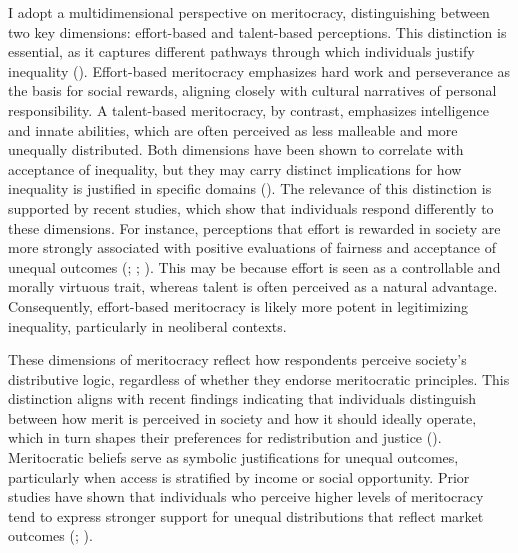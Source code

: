 \documentclass[
  13pt,
]{article}
\begin{document}
I adopt a multidimensional perspective on meritocracy, distinguishing
between two key dimensions: effort-based and talent-based perceptions.
This distinction is essential, as it captures different pathways through
which individuals justify inequality
(). Effort-based meritocracy
emphasizes hard work and perseverance as the basis for social rewards,
aligning closely with cultural narratives of personal responsibility. A
talent-based meritocracy, by contrast, emphasizes intelligence and
innate abilities, which are often perceived as less malleable and more
unequally distributed. Both dimensions have been shown to correlate with
acceptance of inequality, but they may carry distinct implications for
how inequality is justified in specific domains
().
The relevance of this distinction is supported by recent studies, which
show that individuals respond differently to these dimensions. For
instance, perceptions that effort is rewarded in society are more
strongly associated with positive evaluations of fairness and acceptance
of unequal outcomes (; ;
). This may be because
effort is seen as a controllable and morally virtuous trait, whereas
talent is often perceived as a natural advantage. Consequently,
effort-based meritocracy is likely more potent in legitimizing
inequality, particularly in neoliberal contexts.

These dimensions of meritocracy reflect how respondents perceive
society's distributive logic, regardless of whether they endorse
meritocratic principles. This distinction aligns with recent findings
indicating that individuals distinguish between how merit is perceived
in society and how it should ideally operate, which in turn shapes their
preferences for redistribution and justice
(). Meritocratic beliefs serve as symbolic justifications for
unequal outcomes, particularly when access is stratified by income or
social opportunity. Prior studies have shown that individuals who
perceive higher levels of meritocracy tend to express stronger support
for unequal distributions that reflect market outcomes
(;
).
\end{document}
